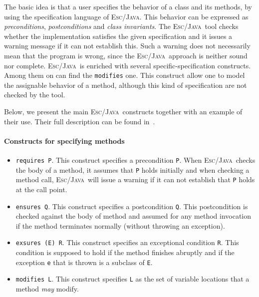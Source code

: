 \documentclass[a4paper]{llncs}
\newcommand{\escj}{\textsc{Esc/Java}}
\begin{document}
The basic idea is that
a user specifies the behavior of a class and its methods, by
using the specification language of \escj. This
behavior can be expressed as \textit{preconditions},
\textit{postconditions} and \textit{class invariants}. The \escj~tool
checks whether the implementation satisfies the given
specification and it issues a warning 
message if it can not establish this. Such a
warning does not necessarily mean that the program is
wrong, since the \escj~approach is neither sound nor
complete. \escj~is enriched with several
specific-specification constructs. Among them on can find the
\texttt{modifies} one. This construct allow one to model the
assignable behavior of a method, although this kind of specification
are not checked by the tool.

Below, we present
the main \escj~constructs together with an example of their
use. Their full description can be found in~\cite{LeinoNS00}. 


\paragraph{\bf Constructs for specifying methods} 
\begin{itemize}
\item{\texttt{requires P}.} 
This construct specifies a precondition {\tt P}. 
When \escj~checks the body of a
method, it assumes that \texttt{P} holds initially and when checking
a method call, \escj~will issue a warning if 
it can not establish that \texttt{P} holds at the call point. 
 
\item{\texttt{ensures Q}.} 
This construct specifies a postcondition \texttt{Q}. This postcondition
is checked against the body of method and assumed for any method
invocation if the method terminates normally (without throwing an
exception).
 
\item{\texttt{exsures (E) R}.}
This construct specifies an exceptional condition \texttt{R}. This
condition is
supposed to hold if the method finishes abruptly and if
the exception \texttt{e} that is thrown is a subclass of \texttt{E}. 
 
\item{\texttt{modifies L}.} 
This construct specifies \texttt{L} as the set of variable locations that
a method \emph{may} modify.
\end{itemize}
 
 
 
\end{document}
